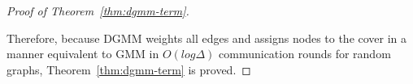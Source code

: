 \begin{proof}[Proof of Theorem~\ref{thm:dgmm-term}]
\label{prf:correct}

Therefore, because DGMM weights all edges and assigns nodes to the cover in a manner equivalent to GMM in $O(log \Delta)$ communication rounds for random graphs, Theorem~\ref{thm:dgmm-term} is proved. 
\end{proof}
